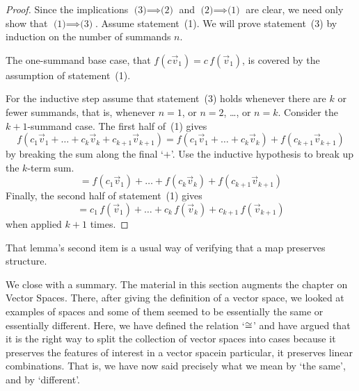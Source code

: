\begin{proof}
Since the implications \mbox{$\text{(3)}\!\implies\!\text{(2)}$} and 
\mbox{$\text{(2)}\!\implies\!\text{(1)}$}
are clear, we need only show that \mbox{$\text{(1)}\!\implies\!\text{(3)}$}.
Assume statement~(1).
We will prove statement~(3) by induction on the number of summands $n$.

The one-summand base case, that
\( f(c\vec{v}_1)=c\,f(\vec{v}_1) \), is covered by the assumption of
statement~(1).

For the inductive step assume that statement~(3) holds whenever 
there are \( k \) or fewer summands, that is, whenever
$n=1$, or $n=2$, \ldots, or $n=k$.
Consider the $k+1$-summand case.
The first half of~(1) gives
\begin{equation*}
  f(c_1\vec{v}_1+\dots+c_k\vec{v}_k+c_{k+1}\vec{v}_{k+1})
  =f(c_1\vec{v}_1+\dots+c_k\vec{v}_k)+f(c_{k+1}\vec{v}_{k+1})
\end{equation*}
by breaking the sum along the final `$+$'.
Use the inductive hypothesis to break up the $k$-term sum.
\begin{equation*}
  =f(c_1\vec{v}_1)+\dots+f(c_k\vec{v}_k)+f(c_{k+1}\vec{v}_{k+1})
\end{equation*}
Finally, the second half of statement~(1) gives
\begin{equation*}
  =c_1\,f(\vec{v}_1)+\dots+c_k\,f(\vec{v}_k)+c_{k+1}\,f(\vec{v}_{k+1})
\end{equation*}
when applied $k+1$ times.
\end{proof}

\noindent That lemma's second item is a usual way of
verifying that a map preserves structure.

We close with a summary.
The material in this section augments the chapter on Vector Spaces.
There, after giving the definition of a vector space, 
we looked at examples of spaces and
some of them seemed to be essentially the same or 
essentially different. 
Here, we have defined the relation 
`\( \cong \)' and 
have argued that it
is the right way to split the collection of vector spaces
into cases because it preserves the features of interest in a vector
space\Dash in particular, it preserves linear combinations.
That is, we have now said precisely what we mean by `the same', 
and by `different'.


